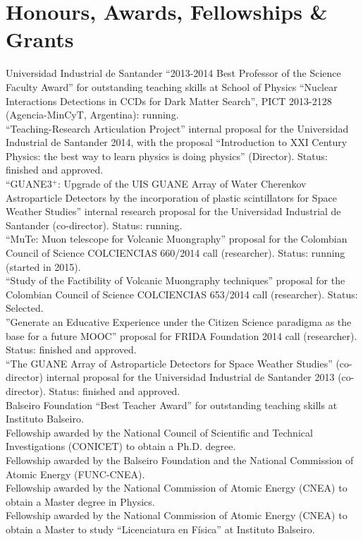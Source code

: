 \section*{Honours, Awards, Fellowships \& Grants}
\noindent
{} Universidad Industrial de Santander ``2013-2014 Best Professor of the Science Faculty Award'' for outstanding teaching skills at School of Physics
 ``Nuclear Interactions Detections in CCDs for Dark Matter Search'', PICT 2013-2128 (Agencia-MinCyT, Argentina): running.\\
 ``Teaching-Research Articulation Project'' internal proposal for the Universidad Industrial de Santander 2014, with the proposal ``Introduction to XXI Century Physics: the best way to learn physics is doing physics'' (Director). Status: finished and approved.\\
 ``GUANE3$^+$: Upgrade of the UIS GUANE Array of Water Cherenkov Astroparticle Detectors by the incorporation of plastic scintillators for Space Weather Studies'' internal research proposal for the Universidad Industrial de Santander (co-director). Status: running.\\
 ``MuTe: Muon telescope for Volcanic Muongraphy'' proposal for the Colombian Council of Science COLCIENCIAS 660/2014 call (researcher). Status: running (started in 2015).\\
 ``Study of the Factibility of Volcanic Muongraphy techniques'' proposal for the Colombian Council of Science COLCIENCIAS 653/2014 call (researcher). Status: Selected.\\
 ''Generate an Educative Experience under the Citizen Science paradigma as the base for a future MOOC'' proposal for FRIDA Foundation 2014 call (researcher). Status: finished and approved.\\ 
 ``The GUANE Array of Astroparticle Detectors for Space Weather Studies'' (co-director) internal proposal for the Universidad Industrial de Santander 2013 (co-director). Status: finished and approved.\\
Balseiro Foundation ``Best Teacher Award'' for outstanding teaching
skills at Instituto Balseiro.\\
Fellowship awarded by the National Council of Scientific and
Technical Investigations (CONICET) to obtain a Ph.D. degree.\\
Fellowship awarded by the Balseiro Foundation and the National
Commission of Atomic Energy (FUNC-CNEA).\\
Fellowship awarded by the National Commission of Atomic Energy
(CNEA) to obtain a Master degree in Physics.\\
Fellowship awarded by the National Commission of Atomic
Energy (CNEA) to obtain a Master to study ``Licenciatura en Física'' at
Instituto Balseiro.
\else
